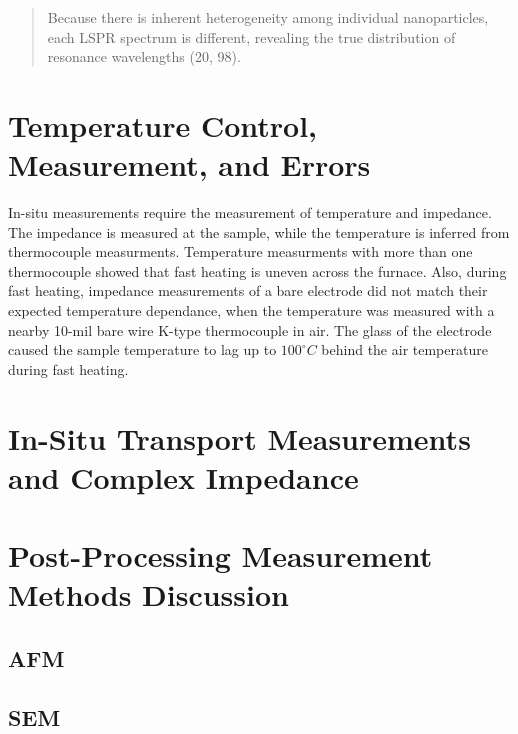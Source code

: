 \documentclass[12pt,oneside,english]{article}
\begin{document}
	\begin{quote}
		Because there is inherent heterogeneity among individual nanoparticles, each LSPR spectrum is different, revealing the true distribution of resonance wavelengths (20, 98).		
		\cite{willets2006}
	\end{quote}
	

	\clearpage 

	\section{Temperature Control, Measurement, and Errors}

	In-situ measurements require the measurement of temperature and impedance.  
	The impedance is measured at the sample, while the temperature is inferred from thermocouple measurments.
	Temperature measurments with more than one thermocouple showed that fast heating is uneven across the furnace.  
	Also, during fast heating, impedance measurements of a bare electrode did not match their expected temperature dependance, when the temperature was measured with a nearby 10-mil bare wire K-type thermocouple in air.
	The glass of the electrode caused the sample temperature to lag up to $100^{\circ}C$ behind the air temperature during fast heating.

	

	\section{In-Situ Transport Measurements and Complex Impedance}

	

	\section{ Post-Processing Measurement Methods Discussion }
	\subsection{AFM}
	\subsection{SEM}
\end{document}
